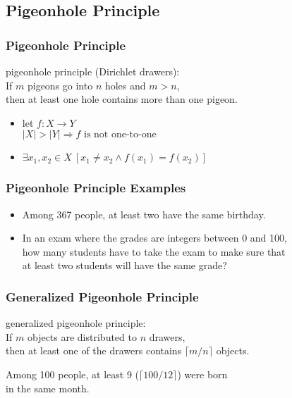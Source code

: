 \documentclass[dvipsnames]{beamer}
\begin{document}
\subsection{Pigeonhole Principle}

\begin{frame}
  \frametitle{Pigeonhole Principle}

  \begin{definition}
    \alert{pigeonhole principle} (Dirichlet drawers):\\
    If $m$ pigeons go into $n$ holes and $m>n$,\\
    then at least one hole contains more than one pigeon.
  \end{definition}

  \pause
  \begin{itemize}
    \item let $f: X \rightarrow Y$\\
      $|X|>|Y| \Rightarrow f \mbox{ is not one-to-one}$

    \item $\exists x_1,x_2 \in X~[x_1 \neq x_2 \wedge f(x_1)=f(x_2)]$
  \end{itemize}
\end{frame}

\begin{frame}
  \frametitle{Pigeonhole Principle Examples}

  \begin{example}
    \begin{itemize}
      \item Among 367 people, at least two have the same birthday.

      \pause
      \item In an exam where the grades are integers between 0 and 100,\\
        how many students have to take the exam to make sure that\\
        at least two students will have the same grade?
    \end{itemize}
  \end{example}
\end{frame}

\begin{frame}
  \frametitle{Generalized Pigeonhole Principle}

  \begin{definition}
    \alert{generalized pigeonhole principle}:\\
    If $m$ objects are distributed to $n$ drawers,\\
    then at least one of the drawers contains $\lceil m / n \rceil$ objects.
  \end{definition}

  \pause
  \begin{example}
    Among 100 people, at least 9 ($\lceil 100 / 12 \rceil$) were born\\
    in the same month.
  \end{example}
\end{frame}
\end{document}

